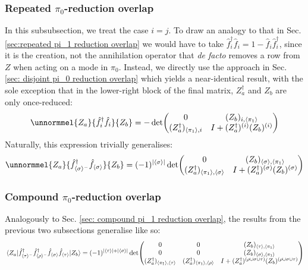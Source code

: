 \documentclass[12pt]{article}
\newcommand{\seq}[1]{\langle #1\rangle}
\newcommand{\hc}{^\dagger}
\begin{document}
	\subsubsection{Repeated $\pi_0$-reduction overlap}
	In this subsubsection, we treat the case $i=j$. To draw an analogy to that in Sec. \ref{sec:repeated pi_1 reduction overlap} we would have to take $\hat{f}\hc_i\hat{f}_i = 1 - \hat{f}_i\hat{f}\hc_i$, since it is the creation, not the annihilation operator that \textit{de facto} removes a row from $Z$ when acting on a mode in $\pi_0$. Instead, we directly use the approach in Sec. \ref{sec: disjoint pi_0 reduction overlap} which yields a near-identical result, with the sole exception that in the lower-right block of the final matrix, $Z_a\hc$ and $Z_b$ are only once-reduced:
	\begin{equation}
	\unnormmel{Z_a}{\hat{f}\hc_i\hat{f}_i}{Z_b}=-\det(\mqty{
		0 & (Z_b)_{i, \seq{\pi_1}}\\
		(Z_a\hc)_{\seq{\pi_1},i} & I+(Z_a\hc)^{(i)}(Z_b)^{(i)}
	})
	\end{equation}
	Naturally, this expression trivially generalises:
	\begin{equation} \label{eq:repeated pi_1 reduction overlap}
	\unnormmel{Z_a}{\hat{f}\hc_{\seq{\sigma}^-}\hat{f}_{\seq{\sigma}}}{Z_b} = (-1)^{\abs{\seq{\sigma}}}\det(\mqty{
		0 & (Z_b)_{\seq{\sigma}, \seq{\pi_1}}\\
		(Z_a\hc)_{\seq{\pi_1},\seq{\sigma}} & I+(Z_a\hc)^{(\sigma)}(Z_b)^{(\sigma)}
	})
	\end{equation}
	
	\subsubsection{Compound $\pi_0$-reduction overlap}
	Analogously to Sec. \ref{sec: compound pi_1 reduction overlap}, the results from the previous two subsections generalise like so:
	\begin{equation} \label{eq:compound pi_0 reduction overlap}
	\mel{Z_a}{\hat{f}\hc_{\seq{\tau}^-}\hat{f}\hc_{\seq{\rho}^-}\hat{f}_{\seq{\sigma}}\hat{f}_{\seq{\tau}}}{Z_b} = (-1)^{\abs{\seq{\tau}}+\abs{\seq{\sigma}}}\det(\mqty{
		0 & 0 & (Z_b)_{\seq{\tau}, \seq{\pi_1}}\\
		0 & 0 & (Z_b)_{\seq{\sigma}, \seq{\pi_1}}\\
		(Z_a\hc)_{\seq{\pi_1}, \seq{\tau}} & (Z_a\hc)_{\seq{\pi_1}, \seq{\rho}} & I+(Z_a\hc)^{(\rho\cup \sigma\cup\tau)}(Z_b)^{(\rho\cup\sigma\cup\tau)}
	})
	\end{equation}
	
\end{document}
